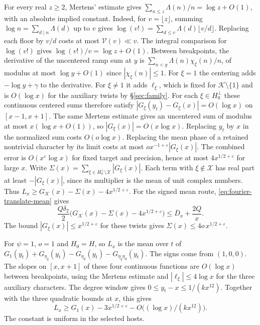 For every real \(z\ge2\), Mertens' estimate gives
\(\sum_{n\le z}\Lambda(n)/n=\log z+O(1)\), with an absolute implied
constant.
\cite[Theorem~2.7(a)]{z6montgomery-vaughan}
Indeed, for \(v=\lfloor z\rfloor\), summing
\(\log n=\sum_{d\mid n}\Lambda(d)\) up to \(v\) gives
\(\log(v!)=\sum_{d\le v}\Lambda(d)\lfloor v/d\rfloor\).
Replacing each floor by \(v/d\) costs at most \(\mathcal V(v)\ll v\).
The integral comparison for \(\log(v!)\) gives \(\log(v!)/v=\log z+O(1)\).
Between breakpoints, the derivative of the uncentered ramp sum at \(y\)
is \(\sum_{n<y}\Lambda(n)\chi_\xi(n)/n\), of modulus at most
\(\log y+O(1)\) since \(|\chi_\xi(n)|\le1\). For \(\xi=1\) the
centering adds \(-\log y+\gamma\) to the derivative. For \(\xi\ne1\)
it adds \(\ell_\xi\), which is fixed for
\(\mathcal K\setminus\{1\}\) and is \(O(\log x)\) for the auxiliary
twists by \S\ref{sec:family}. For each \(\xi\in H_0^\perp\) these
continuous centered sums therefore satisfy
\(|G_\xi(y_t)-G_\xi(x)|=O(\log x)\) on \([x-1,x+1]\).
The same Mertens estimate gives an uncentered sum of modulus
at most \(x(\log x+O(1))\), so \(|G_\xi(x)|=O(x\log x)\). Replacing
\(y_t\) by \(x\) in the normalized sum costs \(O(o\log x)\). Replacing the
mean phase of a retained nontrivial character by its limit costs
at most \(o x^{-1+\varepsilon}|G_\xi(x)|\).
The combined error is \(O(x^\varepsilon\log x)\) for fixed target
and precision, hence at most \(4x^{1/2+\varepsilon}\) for large \(x\).
Write
\(\Sigma(x)=\sum_{\xi\in H_0^\perp\setminus\mathcal X}|G_\xi(x)|\).
Each term with \(\xi\notin\mathcal X\) has real part at least
\(-|G_\xi(x)|\), since its multiplier is the mean of unit complex
numbers. Thus \(L_x\ge G_{\mathcal K}(x)-\Sigma(x)-4x^{1/2+\varepsilon}\).
For the signed mean route, \eqref{eq:fourier-translate-mean} gives
\begin{equation}
\label{eq:fourier-extraction}
 \frac{Q\delta_2}{2}
       \bigl(G_{\mathcal K}(x)-\Sigma(x)-4x^{1/2+\varepsilon}\bigr)
 \le \overline D_x+\frac{2Q}{x}.
\end{equation}
The bound \(|G_\xi(x)|\le x^{1/2+\varepsilon}\) for these twists
gives \(\Sigma(x)\le4o\,x^{1/2+\varepsilon}\).

\leavevmode{}%
For \(\psi=1\), \(o=1\) and \(H_0=H\), so \(L_x\) is the mean over
\(t\) of
\(G_1(y_t)+G_{\eta_q}(y_t)-G_{\eta_d}(y_t)-G_{\eta_q\eta_d}(y_t)\).
The signs come from \((1,0,0)\). The slopes on \([x,x+1]\) of these
four continuous functions are \(O(\log x)\) between breakpoints,
using the Mertens estimate and \(|\ell_\xi|\le4\log x\) for the three
auxiliary characters. The degree window gives \(0\le y_t-x\le1/(kx^{12})\).
Together with the three quadratic bounds at \(x\), this gives
\begin{equation}
\label{eq:classical-character-extraction}
 L_x\ge G_1(x)-3x^{1/2+\varepsilon}-O\bigl((\log x)/(kx^{12})\bigr).
\end{equation}
The constant is uniform in the selected hosts.

